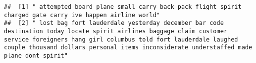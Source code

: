 \documentclass[
]{article}
\begin{document}
\begin{verbatim}
##  [1] " attempted board plane small carry back pack flight spirit charged gate carry ive happen airline world"                                                                                                                                                                                                                                                                                                                                                                                                                                                                                                                                                                                                                                                                                                                                                                                                                                                                                                                                                                                                                                                                   
##  [2] " lost bag fort lauderdale yesterday december bar code destination today locate spirit airlines baggage claim customer service foreigners hang girl columbus told fort lauderdale laughed couple thousand dollars personal items inconsiderate understaffed made plane dont spirit"                                                                                                                                                                                                                                                                                                                                                                                                                                                                                                                                                                                                                                                                                                                                                                                                                                                                                        

\end{verbatim}
\end{document}
